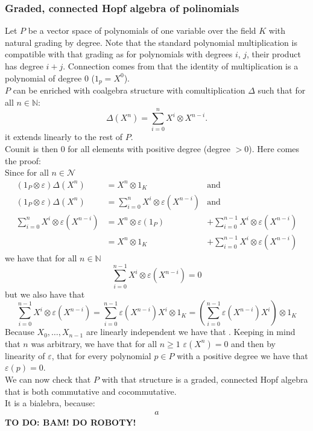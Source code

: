\documentclass[a4paper, 12pt]{article}
\newcommand{\todo}[1]{\hfill \break \textbf{\Huge TO DO: #1 \hfill \break}\normalsize}
\begin{document}
\subsubsection{Graded, connected Hopf algebra of polinomials}
Let $P$ be a vector space of polynomials of one variable over the field $K$ with natural grading by degree.
Note that the standard polynomial multiplication is compatible with that grading as for polynomials with
degrees $i$, $j$, their product has degree $i + j$. Connection comes from that the identity of
multiplication
is a polynomial of degree $0$ ($1_p = X^0$).  \\
$P$ can be enriched with coalgebra structure with comultiplication $\Delta$ such that for all
$n \in \mathbb{N}$:
\begin{equation*}
\Delta(X^n) = \sum^n_{i = 0} X^i \otimes X^{n-i}.
\end{equation*}
it extends linearly to the rest of $P$. \\
Counit is then $0$ for all elements with positive degree (degree $>0$). Here comes the proof: \\
Since for all $n \in \mathcal{N}$
\begin{align*}
(1_P \otimes \varepsilon )\Delta(X^n) &= X^n \otimes 1_K &\mathrm{and} \\
(1_P \otimes \varepsilon )\Delta(X^n) &= \sum^n_{i = 0} X^i \otimes \varepsilon(X^{n-i}) &\mathrm{and} \\
\sum^n_{i = 0} X^i \otimes \varepsilon(X^{n-i}) &= X^n \otimes \varepsilon(1_P) &+
\sum^{n-1}_{i=0} X^i \otimes \varepsilon(X^{n-i}) \\ &=
X^n \otimes 1_K &+ \sum^{n-1}_{i=0} X^i \otimes \varepsilon(X^{n-i})
\end{align*}
we have that for all $n \in \mathbb{N}$
\begin{equation*}
\sum^{n-1}_{i=0} X^i \otimes \varepsilon(X^{n-i}) = 0
\end{equation*}
but we also have that
\begin{equation*}
\sum^{n-1}_{i=0} X^i \otimes \varepsilon(X^{n-i}) = \sum^{n-1}_{i=0} \varepsilon(X^{n-i})X^i \otimes 1_K =
\left( \sum^{n-1}_{i=0} \varepsilon(X^{n-i})X^i \right)\otimes 1_K
\end{equation*}
Because $X_0, \dots, X_{n-1}$ are linearly independent we have that . Keeping in mind that $n$ was arbitrary, we have that for all $n \geq 1$
$\varepsilon(X^n) = 0$ and then by linearity of $\varepsilon$, that for every polynomial $p \in P$ with a
positive degree we have that $\varepsilon(p) = 0$. \\
We can now check that $P$ with that structure is a graded, connected Hopf algebra that is both commutative
and cocommutative. \\
It is a bialebra, because:
\begin{align*}
a
\end{align*}
\todo{BAM! DO ROBOTY!}
\end{document}
